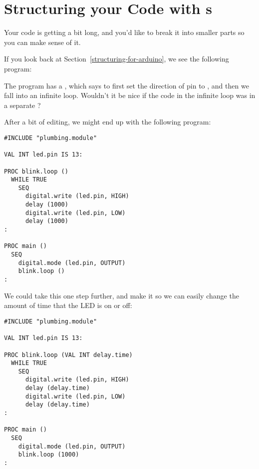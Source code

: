 \makingthingsbreak

\XXX

\seealso

\XXX

% 
\section{Structuring your Code with {\PROC}s}
\problem
Your code is getting a bit long, and you'd like to break it into smaller parts so you can make sense of it.

\solution
If you look back at Section~\vref{structuring-for-arduino}, we see the following program:



The program has a \SEQ, which says to first set the direction of pin \pinthirteen to \OUTPUT, and then we fall into an infinite loop. Wouldn't it be nice if the code in the infinite loop was in a separate \PROC?

After a bit of editing, we might end up with the following program:

\begin{lstlisting}
#INCLUDE "plumbing.module"

VAL INT led.pin IS 13:

PROC blink.loop ()
  WHILE TRUE
    SEQ
      digital.write (led.pin, HIGH)
      delay (1000)
      digital.write (led.pin, LOW)
      delay (1000)
:

PROC main ()
  SEQ
    digital.mode (led.pin, OUTPUT)
    blink.loop ()
:
\end{lstlisting}

We could take this one step further, and make it so we can easily change the amount of time that the LED is on or off:

\begin{lstlisting}
#INCLUDE "plumbing.module"

VAL INT led.pin IS 13:

PROC blink.loop (VAL INT delay.time)
  WHILE TRUE
    SEQ
      digital.write (led.pin, HIGH)
      delay (delay.time)
      digital.write (led.pin, LOW)
      delay (delay.time)
:

PROC main ()
  SEQ
    digital.mode (led.pin, OUTPUT)
    blink.loop (1000)
:
\end{lstlisting}

